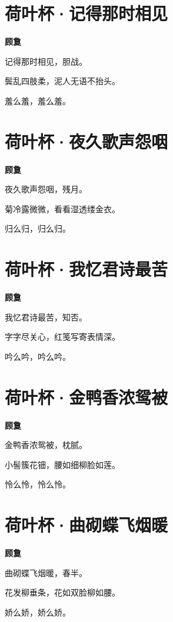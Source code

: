 \documentclass[12pt,a4paper]{ctexbook}
\begin{document}
\section{荷叶杯·记得那时相见}
\textbf{顾敻}\par\vspace{0.5em}
记得那时相见，胆战。\par
鬓乱四肢柔，泥人无语不抬头。\par
羞么羞，羞么羞。\par

\section{荷叶杯·夜久歌声怨咽}
\textbf{顾敻}\par\vspace{0.5em}
夜久歌声怨咽，残月。\par
菊冷露微微，看看湿透缕金衣。\par
归么归，归么归。\par

\section{荷叶杯·我忆君诗最苦}
\textbf{顾敻}\par\vspace{0.5em}
我忆君诗最苦，知否。\par
字字尽关心，红笺写寄表情深。\par
吟么吟，吟么吟。\par

\section{荷叶杯·金鸭香浓鸳被}
\textbf{顾敻}\par\vspace{0.5em}
金鸭香浓鸳被，枕腻。\par
小髻簇花钿，腰如细柳脸如莲。\par
怜么怜，怜么怜。\par

\section{荷叶杯·曲砌蝶飞烟暖}
\textbf{顾敻}\par\vspace{0.5em}
曲砌蝶飞烟暖，春半。\par
花发柳垂条，花如双脸柳如腰。\par
娇么娇，娇么娇。\par
\end{document}
